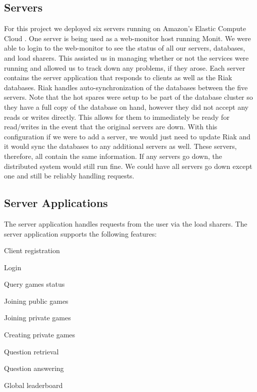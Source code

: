 \documentclass{dependencies/acm_proc_article-sp}
\begin{document}
\subsection{Servers}
For this project we deployed six servers running on Amazon's Elastic Compute Cloud \cite{aec}.
One server is being used as a web-monitor host running Monit\cite{monit}.
We were able to login to the web-monitor to see the status of all our servers, databases, and load sharers.
This assisted us in managing whether or not the services were running and allowed us to track down any problems, if they arose.
Each server contains the server application that responds to clients as well as the Riak \cite{riak} databases.
Riak handles auto-synchronization of the databases between the five servers.
Note that the hot spares were setup to be part of the database cluster so they have a full copy of the database on hand, however they did not accept any reads or writes directly.
This allows for them to immediately be ready for read/writes in the event that the original servers are down.
With this configuration if we were to add a server, we would just need to update Riak and it would sync the databases to any additional servers as well.
These servers, therefore, all contain the same information.
If any servers go down, the distributed system would still run fine.
We could have all servers go down except one and still be reliably handling requests.

\subsection{Server Applications}
The server application handles requests from the user via the load sharers.
The server application supports the following features:
\begin{itemized}
\item Client registration
\item Login
\item Query games status
\item Joining public games
\item Joining private games
\item Creating private games
\item Question retrieval
\item Question answering
\item Global leaderboard
\end{itemized}
\end{document}
